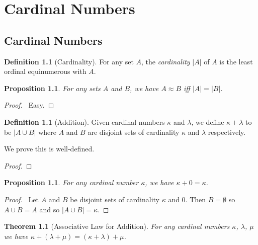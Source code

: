 \documentclass{book}
\let\qed\relax
\newtheorem{prop}[ax]{Proposition}
\newtheorem{thm}[ax]{Theorem}
\theoremstyle{definition}
\newtheorem{df}[ax]{Definition}
\begin{document}
\chapter{Cardinal Numbers}

\section{Cardinal Numbers}

\begin{df}[Cardinality]
For any set $A$, the \emph{cardinality} $|A|$ of $A$ is the least ordinal equinumerous with $A$.
\end{df}

\begin{prop}
For any sets $A$ and $B$, we have $A \approx B$ iff $|A| = |B|$.
\end{prop}

\begin{proof}
\pf\ Easy. \qed
\end{proof}

\begin{df}[Addition]
Given cardinal numbers $\kappa$ and $\lambda$, we define $\kappa + \lambda$ to be $|A \cup B|$ where $A$ and $B$ are disjoint sets of cardinality $\kappa$ and $\lambda$ respectively.

We prove this is well-defined.
\end{df}

\begin{proof}
\pf
{}
\qed
\end{proof}

\begin{prop}
For any cardinal number $\kappa$, we have $\kappa + 0 = \kappa$.
\end{prop}

\begin{proof}
\pf\ Let $A$ and $B$ be disjoint sets of cardinality $\kappa$ and 0. Then $B = \emptyset$ so $A \cup B = A$ and so $|A \cup B| = \kappa$. \qed
\end{proof}

\begin{thm}[Associative Law for Addition]
For any cardinal numbers $\kappa$, $\lambda$, $\mu$ we have $\kappa + (\lambda + \mu) = (\kappa + \lambda) + \mu$.
\end{thm}
\end{document}
